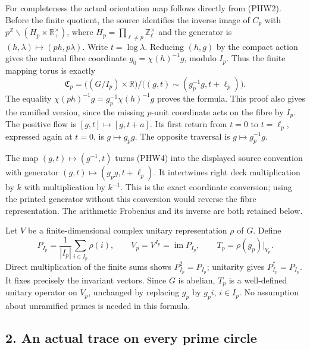 \documentclass[
  10pt,
  a4paper,
]{article}
\begin{document}
For completeness the actual orientation map follows directly from
(PHW2). Before the finite quotient, the source identifies the inverse
image of \(C_p\) with
\(p^{\mathbb Z}\backslash(H_p\times\mathbb R_+^\times)\), where
\(H_p=\prod_{\ell\ne p}\mathbb Z_\ell^\times\) and the generator is
\((h,\lambda)\mapsto(ph,p\lambda)\). Write \(t=\log\lambda\). Reducing
\((h,g)\) by the compact action gives the natural fibre coordinate
\(g_0=\chi(h)^{-1}g\), modulo \(I_p\). Thus the finite mapping torus is
exactly \[
\mathfrak C_p=
\bigl((G/I_p)\times\mathbb R\bigr)
\big/\bigl((g,t)\sim(g_p^{-1}g,t+\ell_p)\bigr).
\tag{PHW4}
\] The equality \(\chi(ph)^{-1}g=g_p^{-1}\chi(h)^{-1}g\) proves the
formula. This proof also gives the ramified version, since the missing
\(p\)-unit coordinate acts on the fibre by \(I_p\). The positive flow is
\([g,t]\mapsto[g,t+a]\). Its first return from \(t=0\) to \(t=\ell_p\),
expressed again at \(t=0\), is \(g\mapsto g_pg\). The opposite traversal
is \(g\mapsto g_p^{-1}g\).

The map \((g,t)\mapsto(g^{-1},t)\) turns (PHW4) into the displayed
source convention with generator \((g,t)\mapsto(g_pg,t+\ell_p)\). It
intertwines right deck multiplication by \(k\) with multiplication by
\(k^{-1}\). This is the exact coordinate conversion; using the printed
generator without this conversion would reverse the fibre
representation. The arithmetic Frobenius and its inverse are both
retained below.

Let \(V\) be a finite-dimensional complex unitary representation
\(\rho\) of \(G\). Define \[
P_{I_p}=\frac1{|I_p|}\sum_{i\in I_p}\rho(i),
\qquad V_p=V^{I_p}=\operatorname{im}P_{I_p},
\qquad T_p=\rho(g_p)|_{V_p}.
\tag{PHW5}
\] Direct multiplication of the finite sums shows \(P_{I_p}^2=P_{I_p}\);
unitarity gives \(P_{I_p}^*=P_{I_p}\). It fixes precisely the invariant
vectors. Since \(G\) is abelian, \(T_p\) is a well-defined unitary
operator on \(V_p\), unchanged by replacing \(g_p\) by \(g_pi\),
\(i\in I_p\). No assumption about unramified primes is needed in this
formula.

\subsection{2. An actual trace on every prime
circle}\label{an-actual-trace-on-every-prime-circle}
\end{document}

